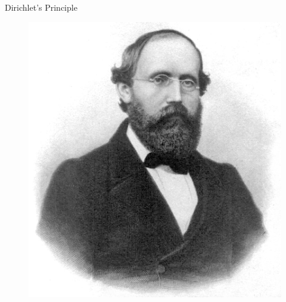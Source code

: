 \documentclass[aspectratio=169,xcolor=dvipsnames,11pt]{beamer}
\begin{document}
\begin{frame}{Dirichlet's Principle}
\begin{minipage}{0.3\textwidth}
\begin{figure}
\begin{minipage}[b]{0.45\textwidth}
  \end{minipage}
  \hfill
  \begin{minipage}[b]{0.45\textwidth}
    \includegraphics[width=\linewidth]{figures/riemann.jpg}
  \end{minipage}
\end{figure}
    \end{minipage}
\end{frame}
\end{document}
